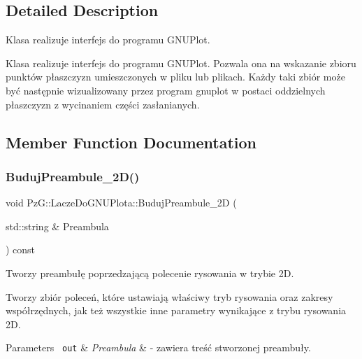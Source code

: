 \subsection{Detailed Description}
Klasa realizuje interfejs do programu G\+N\+U\+Plot. 

Klasa realizuje interfejs do programu G\+N\+U\+Plot. Pozwala ona na wskazanie zbioru punktów płaszczyzn umieszczonych w pliku lub plikach. Każdy taki zbiór może być następnie wizualizowany przez program gnuplot w postaci oddzielnych płaszczyzn z wycinaniem części zasłanianych. 

\subsection{Member Function Documentation}
\mbox{\label{class_pz_g_1_1_lacze_do_g_n_u_plota_a0ac655ff1934abb69ea668cd92ae77ec}} 
\subsubsection{\texorpdfstring{BudujPreambule\_2D()}{BudujPreambule\_2D()}}
{\footnotesize\ttfamily void Pz\+G\+::\+Lacze\+Do\+G\+N\+U\+Plota\+::\+Buduj\+Preambule\+\_\+2D (\begin{DoxyParamCaption}\item[{std\+::string \&}]{Preambula }\end{DoxyParamCaption}) const\hspace{0.3cm}{\ttfamily [protected]}}



Tworzy preambułę poprzedzającą polecenie rysowania w trybie 2D. 

Tworzy zbiór poleceń, które ustawiają właściwy tryb rysowania oraz zakresy współrzędnych, jak też wszystkie inne parametry wynikające z trybu rysowania 2D. 
\begin{DoxyParams}[1]{Parameters}
\mbox{\texttt{ out}}  & {\em Preambula} & -\/ zawiera treść stworzonej preambuły. \\
\hline
\end{DoxyParams}
\mbox{\label{class_pz_g_1_1_lacze_do_g_n_u_plota_a50a544677e52829cac4dd4a95b821dcb}} 
